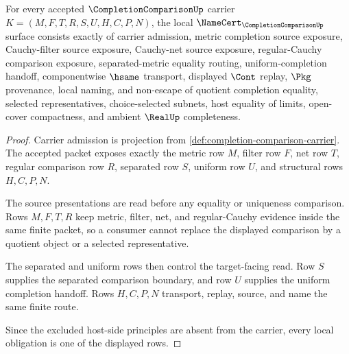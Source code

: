 \begin{theorem}
\label{thm:completion-comparison-namecert-obligations}
For every accepted $\CompletionComparisonUp$ carrier $K=(M,F,T,R,S,U,H,C,P,N)$, the local $\NameCert_{\CompletionComparisonUp}$ surface consists exactly of carrier admission, metric completion source exposure, Cauchy-filter source exposure, Cauchy-net source exposure, regular-Cauchy comparison exposure, separated-metric equality routing, uniform-completion handoff, componentwise $\hsame$ transport, displayed $\Cont$ replay, $\Pkg$ provenance, local naming, and non-escape of quotient completion equality, selected representatives, choice-selected subnets, host equality of limits, open-cover compactness, and ambient $\RealUp$ completeness.
\end{theorem}
\begin{proof}
Carrier admission is projection from \autoref{def:completion-comparison-carrier}. The accepted packet exposes exactly the metric row $M$, filter row $F$, net row $T$, regular comparison row $R$, separated row $S$, uniform row $U$, and structural rows $H,C,P,N$.

The source presentations are read before any equality or uniqueness comparison. Rows $M,F,T,R$ keep metric, filter, net, and regular-Cauchy evidence inside the same finite packet, so a consumer cannot replace the displayed comparison by a quotient object or a selected representative.

The separated and uniform rows then control the target-facing read. Row $S$ supplies the separated comparison boundary, and row $U$ supplies the uniform completion handoff. Rows $H,C,P,N$ transport, replay, source, and name the same finite route.

Since the excluded host-side principles are absent from the carrier, every local obligation is one of the displayed rows.
\end{proof}

